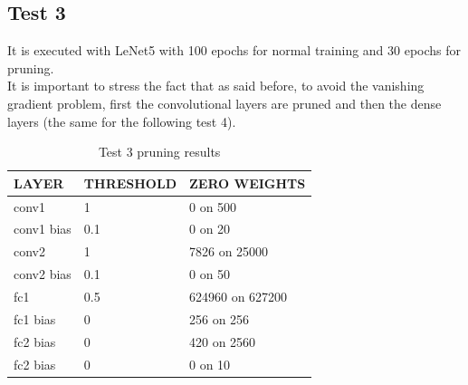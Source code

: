 \documentclass[journal]{vgtc}                %
\begin{document}
\subsection{Test 3}
It is executed with LeNet5 with 100 epochs for normal training and 30 epochs for pruning.\\It is important to stress the fact that as said before, to avoid the vanishing gradient problem, first the convolutional layers are pruned and then the dense layers (the same for the following test 4).
\begin{table}[H]
\caption{Test 3 pruning results}
\label{my-label}
\begin{tabular}{|l|l|l|}
\hline
LAYER    & THRESHOLD & ZERO WEIGHTS     \\ \hline
conv1      & 1         & 0 on 500 \\ \hline
conv1 bias & 0.1       & 0 on 20        \\ \hline
conv2      & 1         & 7826 on 25000   \\ \hline
conv2 bias & 0.1       & 0 on 50       \\ \hline
fc1      & 0.5       & 624960 on 627200      \\ \hline
fc1 bias & 0         & 256 on 256          \\ \hline
fc2 bias & 0         & 420 on 2560          \\ \hline
fc2 bias & 0         & 0 on 10          \\ \hline

\end{tabular}
\end{table}
\end{document}
